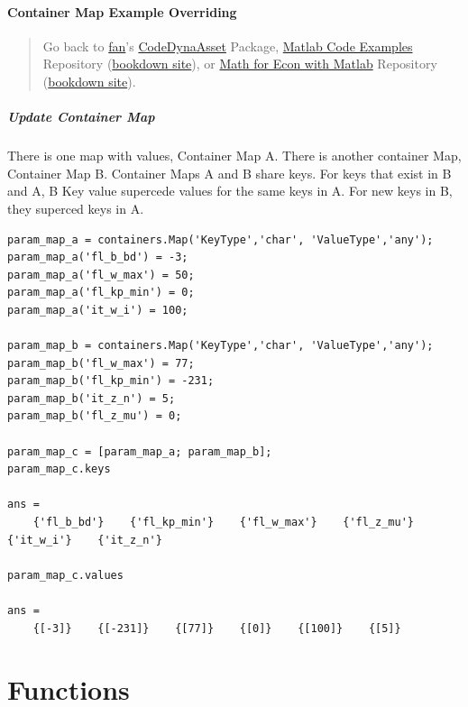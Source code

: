 \documentclass[
]{book}
\begin{document}
\hypertarget{container-map-example-overriding}{%
\subsubsection{Container Map Example Overriding}\label{container-map-example-overriding}}

\begin{quote}
Go back to \href{http://fanwangecon.github.io/}{fan}'s \href{https://fanwangecon.github.io/CodeDynaAsset/}{CodeDynaAsset} Package, \href{https://fanwangecon.github.io/M4Econ/}{Matlab Code Examples} Repository (\href{https://fanwangecon.github.io/M4Econ/bookdown}{bookdown site}), or \href{https://fanwangecon.github.io/Math4Econ/}{Math for Econ with Matlab} Repository (\href{https://fanwangecon.github.io/Math4Econ/bookdown}{bookdown site}).
\end{quote}

\hypertarget{update-container-map}{%
\paragraph{Update Container Map}\label{update-container-map}}

There is one map with values, Container Map A. There is another
container Map, Container Map B. Container Maps A and B share keys. For
keys that exist in B and A, B Key value supercede values for the same
keys in A. For new keys in B, they superced keys in A.

\begin{verbatim}
param_map_a = containers.Map('KeyType','char', 'ValueType','any');
param_map_a('fl_b_bd') = -3;
param_map_a('fl_w_max') = 50;
param_map_a('fl_kp_min') = 0;
param_map_a('it_w_i') = 100;

param_map_b = containers.Map('KeyType','char', 'ValueType','any');
param_map_b('fl_w_max') = 77;
param_map_b('fl_kp_min') = -231;
param_map_b('it_z_n') = 5;
param_map_b('fl_z_mu') = 0;

param_map_c = [param_map_a; param_map_b];
param_map_c.keys

ans = 
    {'fl_b_bd'}    {'fl_kp_min'}    {'fl_w_max'}    {'fl_z_mu'}    {'it_w_i'}    {'it_z_n'}

param_map_c.values

ans = 
    {[-3]}    {[-231]}    {[77]}    {[0]}    {[100]}    {[5]}
\end{verbatim}

\hypertarget{functions}{%
\chapter{Functions}\label{functions}}
\end{document}
